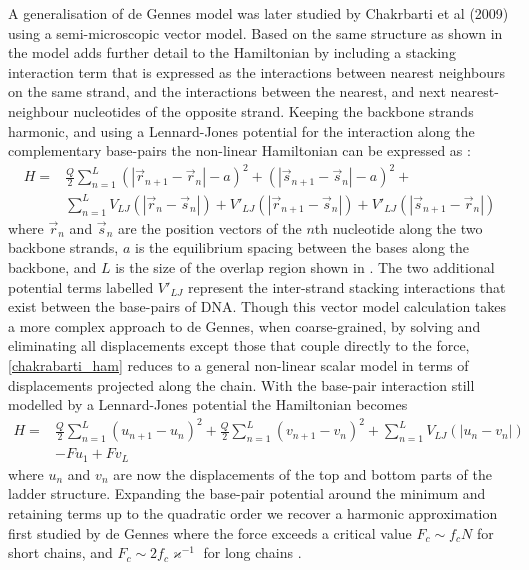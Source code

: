 A generalisation of de Gennes model was later studied by Chakrbarti et al (2009) using a semi-microscopic vector model. Based on the same structure as shown in  the model adds further detail to the Hamiltonian by including a stacking interaction term that is expressed as the interactions between nearest neighbours on the same strand, and the interactions between the nearest, and next nearest-neighbour nucleotides of the opposite strand. Keeping the backbone strands harmonic, and using a Lennard-Jones potential for the interaction along the complementary base-pairs the non-linear Hamiltonian can be expressed as \cite{Chakrabarti2009}:
%
\begin{align}
\label{chakrabarti_ham}
H=&\frac{Q}{2}\sum^{L}_{n=1}\left(|\vec{r}_{n+1}-\vec{r}_{n}|-a\right)^{2} +\left(|\vec{s}_{n+1}-\vec{s}_{n}|-a\right)^{2} + \\
&\sum^{L}_{n=1} V_{LJ}\left(|\vec{r}_{n}-\vec{s}_{n}|\right) + V'_{LJ}\left(|\vec{r}_{n+1}-\vec{s}_{n}|\right) + V'_{LJ}\left(|\vec{s}_{n+1}-\vec{r}_{n}|\right)\nonumber
\end{align}
%
where $\vec{r}_{n}$ and $\vec{s}_{n}$ are the position vectors of the $n$th nucleotide along the two backbone strands, $a$ is the equilibrium spacing between the bases along the backbone, and $L$ is the size of the overlap region shown in . The two additional potential terms labelled $V'_{LJ}$ represent the inter-strand stacking interactions that exist between the base-pairs of DNA. 
%
Though this vector model calculation takes a more complex approach to de Gennes, when coarse-grained, by solving and eliminating all displacements except those that couple directly to the force, \eqref{chakrabarti_ham} reduces to a general non-linear scalar model in terms of displacements projected along the chain. With the base-pair interaction still modelled by a Lennard-Jones potential the Hamiltonian becomes \cite{Chakrabarti2009}
%
\begin{align}
\label{chakrabarti_ham_1}
H=&\frac{Q}{2}\sum^{L}_{n=1}\left(u_{n+1}-u_{n}\right)^{2} +\frac{Q}{2}\sum^{L}_{n=1}\left(v_{n+1}-v_{n}\right)^{2} +\sum^{L}_{n=1}V_{LJ}\left(|u_{n}-v_{n}|\right)\\ &-Fu_{1}+Fv_{L}\nonumber
\end{align}
%
where $u_{n}$ and $v_{n}$ are now the displacements of the top and bottom parts of the ladder structure. Expanding the base-pair potential around the minimum and retaining terms up to the quadratic order we recover a harmonic approximation first studied by de Gennes where the force exceeds a critical value $F_{c} \sim f_{c}N$ for short chains, and $F_{c} \sim 2f_{c}\varkappa^{-1}$ for long chains \cite{Chakrabarti2009}. 

